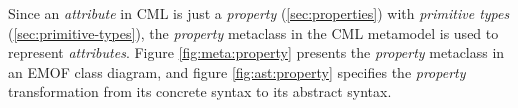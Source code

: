 \begin{abstract-syntax}
Since an \emph{attribute} in CML is just a \emph{property} (\ref{sec:properties})
with \emph{primitive types} (\ref{sec:primitive-types}),
the \emph{property} metaclass in the CML metamodel is used to represent
\emph{attributes}.
Figure \ref{fig:meta:property} presents the \emph{property} metaclass
in an EMOF \cite{mof} class diagram,
and figure \ref{fig:ast:property} specifies
the \emph{property} transformation
from its concrete syntax to its abstract syntax.
\end{abstract-syntax}
